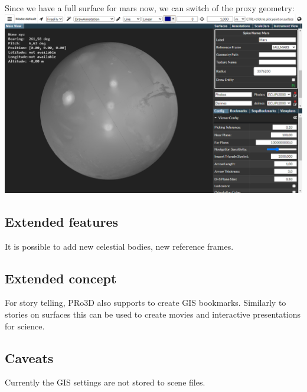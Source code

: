 Since we have a full surface for mars now, we can switch of the proxy
geometry: \includegraphics{images/molaObservation.png}

\hypertarget{extended-features}{%
\subsection{Extended features}\label{extended-features}}

It is possible to add new celestial bodies, new reference frames.

\hypertarget{extended-concept}{%
\subsection{Extended concept}\label{extended-concept}}

For story telling, PRo3D also supports to create GIS bookmarks.
Similarly to stories on surfaces this can be used to create movies and
interactive presentations for science.

\hypertarget{caveats}{%
\subsection{Caveats}\label{caveats}}

Currently the GIS settings are not stored to scene files.
